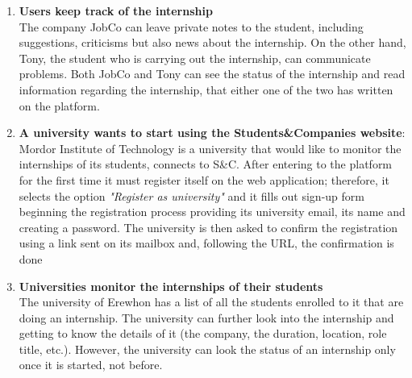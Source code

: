 \begin{enumerate}
            \item \textbf{Users keep track of the internship }
            \\ The company JobCo can leave private notes to the student, including suggestions, criticisms but also news about the internship. On the other hand, Tony, the student who is carrying out the internship, can communicate problems. Both JobCo and Tony can see the status of the internship and read information regarding the internship, that either one of the two has written on the platform.
            \item \textbf{A university wants to start using the Students\&Companies website}:
            Mordor Institute of Technology is a university that would like to monitor the internships of its students, connects to S\&C. After entering to the platform for the first time it must register itself on the web application; therefore, it selects the option \textit{"Register as university"} and it fills out sign-up form beginning the registration process providing its university email, its name and creating a password. The university is then asked to confirm the registration using a link sent on its mailbox and, following the URL, the confirmation is done
            
            \item \textbf{Universities monitor the internships of their students }
            \\ The university of Erewhon has a list of all the students enrolled to it that are doing an internship. The university can further look into the internship and getting to know the details of it (the company, the duration, location, role title, etc.). However, the university can look the status of an internship only once it is started, not before.
        \end{enumerate}
        
